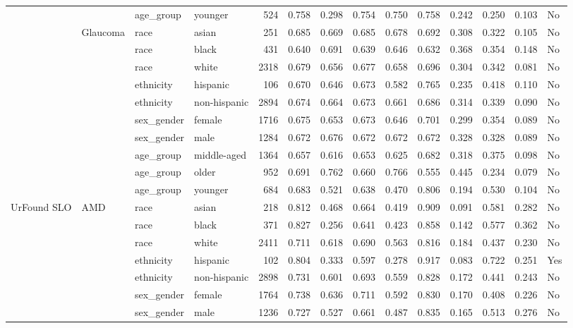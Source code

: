 \begin{longtable}{@{}lll l rrrrrrrr@{}}
 &  & age\_group & younger & 524 & 0.758 & 0.298 & 0.754 & 0.750 & 0.758 & 0.242 & 0.250 & 0.103 & No \\
 & Glaucoma & race & asian & 251 & 0.685 & 0.669 & 0.685 & 0.678 & 0.692 & 0.308 & 0.322 & 0.105 & No \\
 &  & race & black & 431 & 0.640 & 0.691 & 0.639 & 0.646 & 0.632 & 0.368 & 0.354 & 0.148 & No \\
 &  & race & white & 2318 & 0.679 & 0.656 & 0.677 & 0.658 & 0.696 & 0.304 & 0.342 & 0.081 & No \\
 &  & ethnicity & hispanic & 106 & 0.670 & 0.646 & 0.673 & 0.582 & 0.765 & 0.235 & 0.418 & 0.110 & No \\
 &  & ethnicity & non-hispanic & 2894 & 0.674 & 0.664 & 0.673 & 0.661 & 0.686 & 0.314 & 0.339 & 0.090 & No \\
 &  & sex\_gender & female & 1716 & 0.675 & 0.653 & 0.673 & 0.646 & 0.701 & 0.299 & 0.354 & 0.089 & No \\
 &  & sex\_gender & male & 1284 & 0.672 & 0.676 & 0.672 & 0.672 & 0.672 & 0.328 & 0.328 & 0.089 & No \\
 &  & age\_group & middle-aged & 1364 & 0.657 & 0.616 & 0.653 & 0.625 & 0.682 & 0.318 & 0.375 & 0.098 & No \\
 &  & age\_group & older & 952 & 0.691 & 0.762 & 0.660 & 0.766 & 0.555 & 0.445 & 0.234 & 0.079 & No \\
 &  & age\_group & younger & 684 & 0.683 & 0.521 & 0.638 & 0.470 & 0.806 & 0.194 & 0.530 & 0.104 & No \\
UrFound SLO & AMD & race & asian & 218 & 0.812 & 0.468 & 0.664 & 0.419 & 0.909 & 0.091 & 0.581 & 0.282 & No \\
 &  & race & black & 371 & 0.827 & 0.256 & 0.641 & 0.423 & 0.858 & 0.142 & 0.577 & 0.362 & No \\
 &  & race & white & 2411 & 0.711 & 0.618 & 0.690 & 0.563 & 0.816 & 0.184 & 0.437 & 0.230 & No \\
 &  & ethnicity & hispanic & 102 & 0.804 & 0.333 & 0.597 & 0.278 & 0.917 & 0.083 & 0.722 & 0.251 & Yes \\
 &  & ethnicity & non-hispanic & 2898 & 0.731 & 0.601 & 0.693 & 0.559 & 0.828 & 0.172 & 0.441 & 0.243 & No \\
 &  & sex\_gender & female & 1764 & 0.738 & 0.636 & 0.711 & 0.592 & 0.830 & 0.170 & 0.408 & 0.226 & No \\
 &  & sex\_gender & male & 1236 & 0.727 & 0.527 & 0.661 & 0.487 & 0.835 & 0.165 & 0.513 & 0.276 & No \\

\end{longtable}
